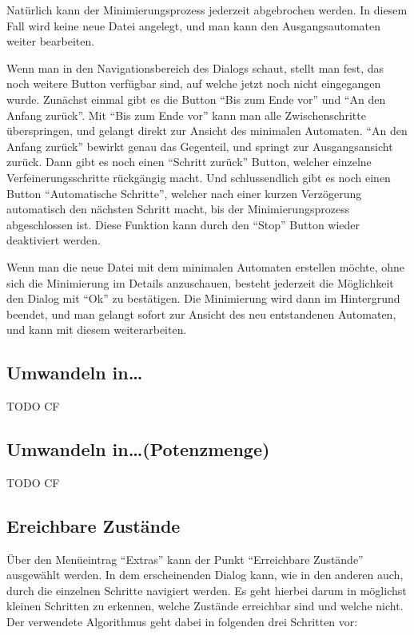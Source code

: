   Natürlich kann der Minimierungsprozess jederzeit abgebrochen werden. In
  diesem Fall wird keine neue Datei angelegt, und man kann den
  Ausgangsautomaten weiter bearbeiten. \vspace{10pt}
  
  Wenn man in den Navigationsbereich des Dialogs schaut, stellt man fest, das
  noch weitere Button verfügbar sind, auf welche jetzt noch nicht eingegangen
  wurde. Zunächst einmal gibt es die Button "`Bis zum Ende vor"' und "`An den
  Anfang zurück"'. Mit "`Bis zum Ende vor"' kann man alle Zwischenschritte
  überspringen, und gelangt direkt zur Ansicht des minimalen Automaten. "`An den
  Anfang zurück"' bewirkt genau das Gegenteil, und springt zur Ausgangsansicht
  zurück. Dann gibt es noch einen "`Schritt zurück"' Button, welcher einzelne
  Verfeinerungsschritte rückgängig macht. Und schlussendlich gibt es noch einen
  Button "`Automatische Schritte"', welcher nach einer kurzen Verzögerung
  automatisch den nächsten Schritt macht, bis der Minimierungsprozess
  abgeschlossen ist. Diese Funktion kann durch den "`Stop"' Button wieder
  deaktiviert werden.\vspace{10pt}
  
  Wenn man die neue Datei mit dem minimalen Automaten erstellen möchte, ohne
  sich die Minimierung im Details anzuschauen, besteht jederzeit die
  Möglich\-keit den Dialog mit "`Ok"' zu bestätigen. Die Minimierung wird dann im
  Hintergrund beendet, und man gelangt sofort zur Ansicht des neu entstandenen
  Automaten, und kann mit diesem weiterarbeiten.
  
  
\subsection{Umwandeln in\ldots}
  
  TODO CF
  
\subsection{Umwandeln in\ldots (Potenzmenge)}
  
  TODO CF


\subsection{Ereichbare Zustände}

Über den Menüeintrag "`Extras"' kann der Punkt "`Erreichbare Zustände"'
ausgewählt werden. In dem erscheinenden Dialog kann, wie in den anderen auch,
durch die einzelnen Schritte navigiert werden. Es geht hierbei darum in möglichst
kleinen Schritten zu erkennen, welche Zustände erreichbar sind und welche nicht.
Der verwendete Algorithmus geht dabei in folgenden drei Schritten vor:

